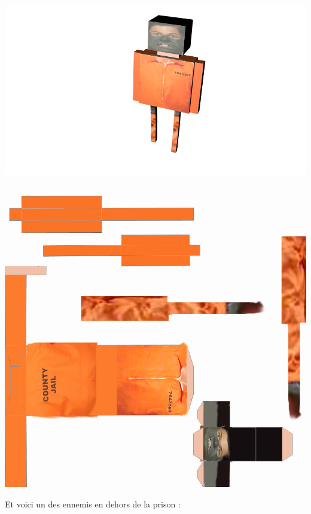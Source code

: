\documentclass{article}
\begin{document}
\begin{center}
\includegraphics[scale=0.8]{prisonnierblend.png}
\end{center}
\begin{center}
\includegraphics[scale=0.2]{prisonnier.png}
\end{center}
\newpage
Et voici un des ennemis en dehors de la prison : 
\end{document}

